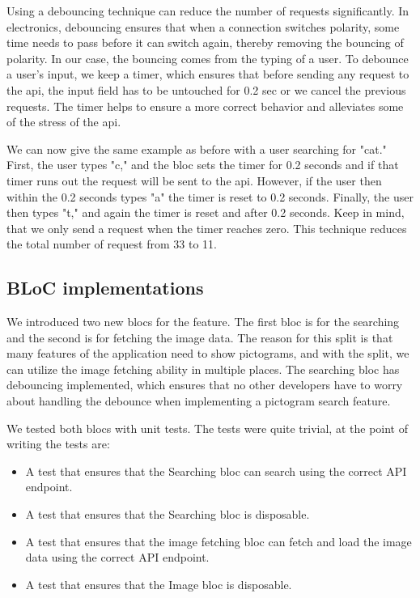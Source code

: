 Using a debouncing technique can reduce the number of requests significantly. In electronics, debouncing ensures that when a connection switches polarity, some time needs to pass before it can switch again, thereby removing the bouncing of polarity. In our case, the bouncing comes from the typing of a user. To debounce a user's input, we keep a timer, which ensures that before sending any request to the \gls{api}, the input field has to be untouched for 0.2 sec or we cancel the previous requests. The timer helps to ensure a more correct behavior and alleviates some of the stress of the \gls{api}.

We can now give the same example as before with a user searching for "cat." First, the user types "c," and the \gls{bloc} sets the timer for 0.2 seconds and if that timer runs out the request will be sent to the \gls{api}. However, if the user then within the 0.2 seconds types "a" the timer is reset to 0.2 seconds. Finally, the user then types "t," and again the timer is reset and after 0.2 seconds. Keep in mind, that we only send a request when the timer reaches zero. This technique reduces the total number of request from 33 to 11.

\subsection{BLoC implementations}
We introduced two new \glspl{bloc} for the feature. The first \gls{bloc} is for the searching and the second is for fetching the image data. The reason for this split is that many features of the application need to show pictograms, and with the split, we can utilize the image fetching ability in multiple places. The searching \gls{bloc} has debouncing implemented, which ensures that no other developers have to worry about handling the debounce when implementing a pictogram search feature.

We tested both \glspl{bloc} with unit tests. The tests were quite trivial, at the point of writing the tests are:

\begin{itemize}
  \item A test that ensures that the Searching \gls{bloc} can search using the correct API endpoint.
  \item A test that ensures that the Searching \gls{bloc} is disposable.
  \item A test that ensures that the image fetching \gls{bloc} can fetch and load the image data using the correct API endpoint.
  \item A test that ensures that the Image \gls{bloc} is disposable.
\end{itemize}

